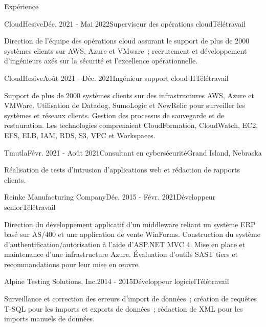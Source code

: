 \documentclass{resume} %
\begin{document}
\begin{rSection}{Exp\'erience}
\begin{rSubsection}{CloudHesive}{D\'ec. 2021 - Mai 2022}{Superviseur des op\'erations cloud}{T\'el\'etravail}
\item Direction de l'\'equipe des op\'erations cloud assurant le support de plus de 2000 syst\`emes clients sur AWS, Azure et VMware~; recrutement et d\'eveloppement d'ing\'enieurs ax\'es sur la s\'ecurit\'e et l'excellence op\'erationnelle.
\end{rSubsection}

\begin{rSubsection}{CloudHesive}{Ao\^ut 2021 - D\'ec. 2021}{Ing\'enieur support cloud II}{T\'el\'etravail}
\item Support de plus de 2000 syst\`emes clients sur des infrastructures AWS, Azure et VMWare. Utilisation de Datadog, SumoLogic et NewRelic pour surveiller les syst\`emes et r\'eseaux clients. Gestion des processus de sauvegarde et de restauration. Les technologies comprenaient CloudFormation, CloudWatch, EC2, EFS, ELB, IAM, RDS, S3, VPC et Workspaces.  
\end{rSubsection}

\begin{rSubsection}{Tmutla}{F\'evr. 2021 - Ao\^ut 2021}{Consultant en cybers\'ecurit\'e}{Grand Island, Nebraska}
\item R\'ealisation de tests d'intrusion d'applications web et r\'edaction de rapports clients.
\end{rSubsection}

\begin{rSubsection}{Reinke Manufacturing Company}{D\'ec. 2015 - F\'evr. 2021}{D\'eveloppeur senior}{T\'el\'etravail} 
\item Direction du d\'eveloppement applicatif d'un middleware reliant un syst\`eme ERP bas\'e sur AS/400 et une application de vente WinForms. Construction du syst\`eme d'authentification/autorisation \`a l'aide d'ASP.NET MVC 4. Mise en place et maintenance d'une infrastructure Azure. \'Evaluation d'outils SAST tiers et recommandations pour leur mise en \oe{}uvre.
\end{rSubsection}

\begin{rSubsection}{Alpine Testing Solutions, Inc.}{2014 - 2015}{D\'eveloppeur logiciel}{T\'el\'etravail}
\item Surveillance et correction des erreurs d'import de donn\'ees~; cr\'eation de requ\^etes T-SQL pour les imports et exports de donn\'ees~; r\'edaction de XML pour les imports manuels de donn\'ees.
\end{rSubsection}


\end{rSection}
\end{document}
